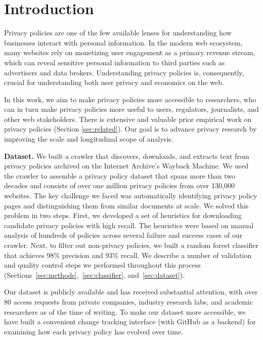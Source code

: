 \section{Introduction}
\label{sec:intro}
Privacy policies are one of the few available lenses for understanding how businesses interact with personal information. In the modern web ecosystem, many websites rely on monetizing user engagement as a primary revenue stream, which can reveal sensitive personal information to third parties such as advertisers and data brokers. Understanding privacy policies is, consequently, crucial for understanding both user privacy and economics on the web.

In this work, we aim to make privacy policies more accessible to researchers, who can in turn make privacy policies more useful to users, regulators, journalists, and other web stakeholders. There is extensive and valuable prior empirical work on privacy policies (Section \ref{sec:related}). Our goal is to advance privacy research by improving the scale and longitudinal scope of analysis.

\textbf{Dataset.} We built a crawler that discovers, downloads, and extracts text from privacy policies archived on the Internet Archive’s Wayback Machine. We used the crawler to assemble a privacy policy dataset that spans more than two decades and consists of over one million privacy policies from over 130,000 websites. The key challenge we faced was automatically identifying privacy policy pages and distinguishing them from similar documents at scale. We solved this problem in two steps. First, we developed a set of heuristics for downloading candidate privacy policies with high recall. The heuristics were based on manual analysis of hundreds of policies across several failure and success cases of our crawler. Next, to filter out non-privacy policies, we built a random forest classifier that achieves 98\% precision and 93\% recall. We describe a number of validation and quality control steps we performed throughout this process (Sections~\ref{sec:methods},~\ref{sec:classifier}, and~\ref{sec:dataset}).

Our dataset is publicly available and has received substantial attention, with over 80 access requests from private companies, industry research labs, and academic researchers as of the time of writing. 
To make our dataset more accessible, we have built a convenient change tracking interface (with GitHub as a backend) for examining how each privacy policy has evolved over time.

